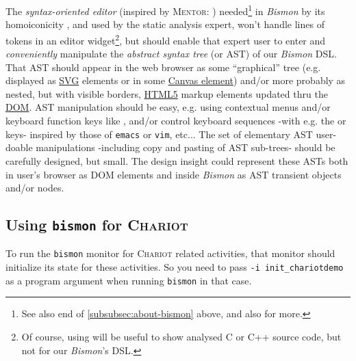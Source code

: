 The \emph{syntax-oriented editor} 
 (inspired by \textsc{Mentor}:
\cite{donzeaugouge:inria-mentor}) needed\footnote{See also end of
  \ref{subsubsec:about-bismon} above, and also
   for more.} in
\emph{Bismon} by its homoiconicity , and used by
the  static analysis expert, won't
handle lines of tokens in an editor widget\footnote{Of course, using
   will be useful to show analysed C or
  C++ source code, but not for our \emph{Bismon}'s  DSL.},
but should enable that expert user to enter and \emph{conveniently}
manipulate the \emph{abstract syntax tree} (or  AST) of our
\emph{Bismon}  DSL. That AST should appear in the web
browser as some ``graphical'' tree (e.g. displayed as
\href{https://en.wikipedia.org/wiki/Scalable\_Vector\_Graphics}{SVG}
 elements or in some
\href{https://en.wikipedia.org/wiki/Canvas\_element}{Canvas element})
and/or more probably as nested, but with visible borders,
\href{https://en.wikipedia.org/wiki/HTML5}{HTML5}  markup
 elements updated thru the 
\href{https://en.wikipedia.org/wiki/Document\_Object\_Model}{DOM}. AST
manipulation should be easy, e.g. using contextual menus and/or
keyboard  function keys  like
,  and/or control keyboard
sequences -with e.g. the
 or  keys- inspired by those of
\texttt{emacs} or \texttt{vim}, etc... The set of elementary AST
user-doable manipulations -including copy
and pasting  of AST sub-trees- should be carefully
designed, but small. The design insight could represent these ASTs
both in user's browser as DOM elements and inside \emph{Bismon} as AST
transient  objects and/or 
nodes.

\medskip

\subsection{Using \texttt{bismon} for \textsc{Chariot}}
\label{subsec:bismon-for-chariot}

To run the \texttt{bismon} monitor for \textsc{Chariot} related
activities, that monitor should initialize its state for these
activities. So you need to pass \texttt{-i init\_chariotdemo} as a
program argument when running \texttt{bismon} in that case.

